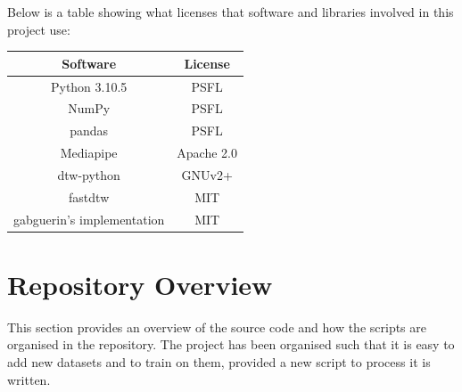 \documentclass[final,rdr32.tex]{subfiles}
\begin{document}
Below is a table showing what licenses that software and libraries involved in this project use:

\begin{table}[H]
    \begin{center}
        \begin{tabular}{ c|c }
            \hline
            Software                   & License    \\
            \hline
            Python 3.10.5              & PSFL       \\
            NumPy                      & PSFL       \\
            pandas                     & PSFL       \\
            Mediapipe                  & Apache 2.0 \\
            dtw-python                 & GNUv2+     \\
            fastdtw                    & MIT        \\
            gabguerin's implementation & MIT        \\

            \hline
        \end{tabular}
    \end{center}
    \label{tab:licensing}
\end{table}

\section{Repository Overview}

This section provides an overview of the source code and how the scripts are organised in the repository. The project has been organised such that it is easy to add new datasets and to train on them, provided a new script to process it is written.
\bigskip
\end{document}
